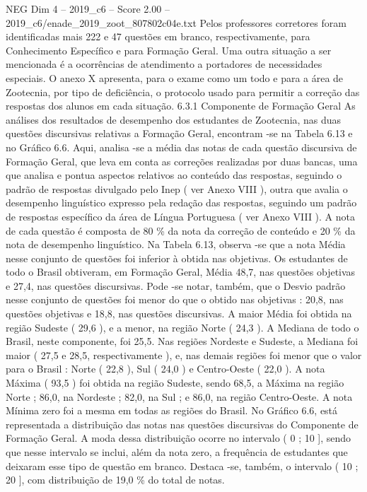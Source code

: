 \begin{textsample}{NEG Dim 4 – 2019\_c6 – Score 2.00 – 2019\_c6/enade\_2019\_zoot\_807802c04e.txt}
Pelos professores corretores foram identificadas mais 222 e 47 questões em branco, respectivamente, para Conhecimento Específico e para Formação Geral.
Uma outra situação a ser mencionada é a ocorrências de atendimento a portadores de necessidades especiais.
O anexo X apresenta, para o exame como um todo e para a área de Zootecnia, por tipo de deficiência, o protocolo usado para permitir a correção das respostas dos alunos em cada situação. 6.3.1 Componente de Formação Geral As análises dos resultados de desempenho dos estudantes de Zootecnia, nas duas questões discursivas relativas a Formação Geral, encontram -se na Tabela 6.13 e no Gráfico 6.6.
Aqui, analisa -se a média das notas de cada questão discursiva de Formação Geral, que leva em conta as correções realizadas por duas bancas, uma que analisa e pontua aspectos relativos ao conteúdo das respostas, seguindo o padrão de respostas divulgado pelo Inep ( ver Anexo VIII ), outra que avalia o desempenho linguístico expresso pela redação das respostas, seguindo um padrão de respostas específico da área de Língua Portuguesa ( ver Anexo VIII ).
A nota de cada questão é composta de 80 \% da nota da correção de conteúdo e 20 \% da nota de desempenho linguístico.
Na Tabela 6.13, observa -se que a nota Média nesse conjunto de questões foi inferior à obtida nas objetivas.
Os estudantes de todo o Brasil obtiveram, em Formação Geral, Média 48,7, nas questões objetivas e 27,4, nas questões discursivas.
Pode -se notar, também, que o Desvio padrão nesse conjunto de questões foi menor do que o obtido nas objetivas : 20,8, nas questões objetivas e 18,8, nas questões discursivas.
A maior Média foi obtida na região Sudeste ( 29,6 ), e a menor, na região Norte ( 24,3 ).
A Mediana de todo o Brasil, neste componente, foi 25,5.
Nas regiões Nordeste e Sudeste, a Mediana foi maior ( 27,5 e 28,5, respectivamente ), e, nas demais regiões foi menor que o valor para o Brasil : Norte ( 22,8 ), Sul ( 24,0 ) e Centro-Oeste ( 22,0 ).
A nota Máxima ( 93,5 ) foi obtida na região Sudeste, sendo 68,5, a Máxima na região Norte ; 86,0, na Nordeste ; 82,0, na Sul ; e 86,0, na região Centro-Oeste.
A nota Mínima zero foi a mesma em todas as regiões do Brasil.
No Gráfico 6.6, está representada a distribuição das notas nas questões discursivas do Componente de Formação Geral.
A moda dessa distribuição ocorre no intervalo ( 0 ; 10 ], sendo que nesse intervalo se inclui, além da nota zero, a frequência de estudantes que deixaram esse tipo de questão em branco.
Destaca -se, também, o intervalo ( 10 ; 20 ], com distribuição de 19,0 \% do total de notas.

\end{textsample}

